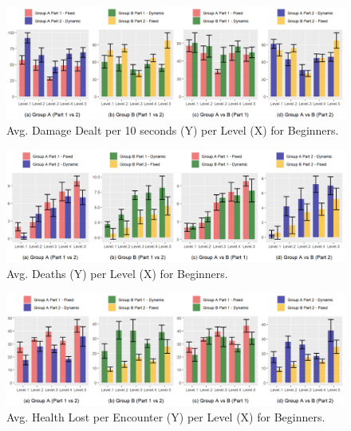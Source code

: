 \begin{figure}[!ht]
    \begin{center}
    \caption{Avg. Damage Dealt per 10 seconds (Y) per Level (X) for Beginners.}
        \includegraphics[width=34em]{figures/damage_dealt_per_10s-beginner_players.png}
    \end{center}
    \label{fig:result-metric-beginners-damage-dealt-per-10s}
\end{figure}

\begin{figure}[!ht]
    \begin{center}
    \caption{Avg. Deaths (Y) per Level (X) for Beginners.}
        \includegraphics[width=34em]{figures/deaths_per_level-beginner_players.png}
    \end{center}
    \label{fig:result-metric-beginners-deaths-per-level}
\end{figure}

\begin{figure}[!ht]
    \begin{center}
    \caption{Avg. Health Lost per Encounter (Y) per Level (X) for Beginners.}
        \includegraphics[width=34em]{figures/health_lost_per_encounter-beginner_players.png}
    \end{center}
    \label{fig:result-metric-beginners-health-lost-per-encounter}
\end{figure}

